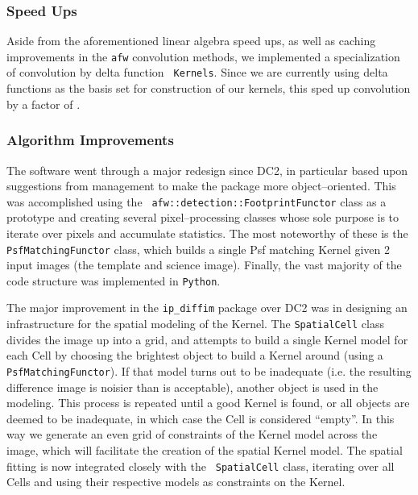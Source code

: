 \subsubsection{Speed Ups}

Aside from the aforementioned linear algebra speed ups, as well as
caching improvements in the {\tt afw} convolution methods, we
implemented a specialization of convolution by delta function {\tt
Kernels}.  Since we are currently using delta functions as the basis
set for construction of our kernels, this sped up convolution by a
factor of \XXX{}.

\subsubsection{Algorithm Improvements}

The software went through a major redesign since DC2, in particular
based upon suggestions from management to make the package more
object--oriented.  This was accomplished using the {\tt
afw::detection::FootprintFunctor} class as a prototype and creating
several pixel--processing classes whose sole purpose is to iterate
over pixels and accumulate statistics.  The most noteworthy of these
is the {\tt PsfMatchingFunctor} class, which builds a single Psf
matching Kernel given 2 input images (the template and science image).
Finally, the vast majority of the code structure was implemented in
{\tt Python}.

The major improvement in the {\tt ip\_diffim} package over DC2 was in
designing an infrastructure for the spatial modeling of the Kernel.
The {\tt SpatialCell} class divides the image up into a grid, and
attempts to build a single Kernel model for each Cell by choosing the
brightest object to build a Kernel around (using a {\tt
PsfMatchingFunctor}).  If that model turns out to be inadequate
(i.e. the resulting difference image is noisier than is acceptable),
another object is used in the modeling.  This process is repeated
until a good Kernel is found, or all objects are deemed to be
inadequate, in which case the Cell is considered ``empty''.  In this
way we generate an even grid of constraints of the Kernel model across
the image, which will facilitate the creation of the spatial Kernel
model.  The spatial fitting is now integrated closely with the {\tt
SpatialCell} class, iterating over all Cells and using their
respective models as constraints on the Kernel.

